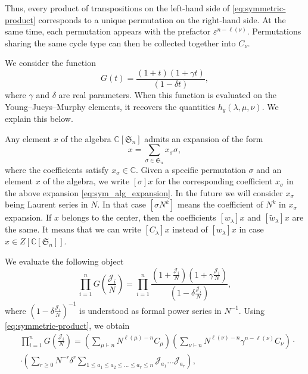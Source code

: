 \documentclass{article}
\theoremstyle{plain}
\theoremstyle{definition}
\numberwithin{equation}{section}
\begin{document}
Thus, every product of transpositions on the left-hand side of \eqref{eq:symmetric-product} corresponds to a unique permutation on the right-hand side. At the same time, each permutation appears with the prefactor $\varepsilon^{n-\ell(\nu)}$. Permutations sharing the same cycle type can then be collected together into $C_\nu$.

We consider the function
\begin{equation}
    \label{eq:G_func}
    G(t) = \frac{(1+t)(1+\gamma t)}{(1-\delta t)},
\end{equation}
where $\gamma$ and $\delta$ are real parameters. When this function is evaluated on the Young--Jucys--Murphy elements, it recovers the quantities $h_g(\lambda,\mu,\nu)$. We explain this below.

Any element $x$ of the algebra $\mathbb{C}[\mathfrak{S}_n]$ admits an expansion of the form
\begin{equation}
    \label{eq:sym_alg_expansion}
    x = \sum_{\sigma \in \mathfrak{S}_n} x_\sigma \sigma,
\end{equation}
where the coefficients satisfy $x_\sigma \in \mathbb{C}$. Given a specific permutation $\sigma$ and an element $x$ of the algebra, we write $[\sigma]x$ for the corresponding coefficient $x_\sigma$ in the above expansion \eqref{eq:sym_alg_expansion}. In the future we will consider $x_\sigma$ being Laurent series in $N$. In that case $[\sigma N^k]$ means the coefficient of $N^k$ in $x_\sigma$ expansion. If $x$ belongs to the center, then the coefficients $[w_\lambda]x$ and $[\tilde w_\lambda]x$ are the same. It means that we can write $[C_\lambda]x$ instead of $[w_\lambda]x$ in case $x \in Z[\mathbb{C}[\mathfrak{S}_n]]$.

We evaluate the following object
\begin{equation}
    \label{eq:G01_initial_expansion_of_permutations}
    \prod_{i=1}^n G\left(\frac{\mathcal{J}_i}{N}\right) = \prod_{i=1}^n \frac{\left(1+\frac{\mathcal{J}_i}{N}\right) \left(1+ \gamma\frac{\mathcal{J}_i}{N}\right)}{\left(1- \delta\frac{\mathcal{J}_i}{N}\right)},
\end{equation}
where $\left(1-\delta\frac{\mathcal{J}_i}{N}\right)^{-1}$ is understood as formal power series in $N^{-1}$. Using \eqref{eq:symmetric-product}, we obtain
\begin{equation}
    \label{eq:G01_initial_expansion_classes}
    \begin{aligned}
        & \prod_{i=1}^n G\left(\frac{\mathcal{J}_i}{N}\right) =  \left(\sum_{\mu \vdash n}N^{\ell(\mu)-n} C_\mu \right) \left(\sum_{\nu \vdash n} N^{\ell(\nu)-n}\gamma^{n-\ell(\nu)}C_\nu \right) \cdot \\
        & \cdot \left(\sum_{r\ge 0}N^{-r}\delta^r \sum_{1 \le a_1 \le a_2 \le \dots \le a_r \le n}\mathcal{J}_{a_1}\dots \mathcal{J}_{a_r}\right),
    \end{aligned}
\end{equation}
\end{document}
